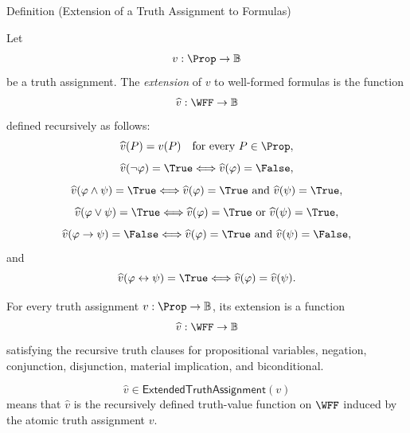 \begin{definitionbox}{Definition (Extension of a Truth Assignment to Formulas)}
\begin{definition}
\label{def:extended-truth-assignment-propositional-logic}
Let
\[
v:\Prop\to\mathbb{B}
\]
be a truth assignment. The \emph{extension} of \(v\) to well-formed formulas is
the function
\[
\widehat v:\WFF\to\mathbb{B}
\]
defined recursively as follows:
\[
\widehat v(P)=v(P)
\quad\text{for every }P\in\Prop,
\]
\[
\widehat v(\neg\varphi)=\True
\Longleftrightarrow
\widehat v(\varphi)=\False,
\]
\[
\widehat v(\varphi\land\psi)=\True
\Longleftrightarrow
\widehat v(\varphi)=\True
\text{ and }
\widehat v(\psi)=\True,
\]
\[
\widehat v(\varphi\lor\psi)=\True
\Longleftrightarrow
\widehat v(\varphi)=\True
\text{ or }
\widehat v(\psi)=\True,
\]
\[
\widehat v(\varphi\to\psi)=\False
\Longleftrightarrow
\widehat v(\varphi)=\True
\text{ and }
\widehat v(\psi)=\False,
\]
and
\[
\widehat v(\varphi\leftrightarrow\psi)=\True
\Longleftrightarrow
\widehat v(\varphi)=\widehat v(\psi).
\]
\end{definition}
\end{definitionbox}

\begin{remark*}
For every truth assignment \(v:\Prop\to\mathbb{B}\), its extension is a function
\[
\widehat v:\WFF\to\mathbb{B}
\]
satisfying the recursive truth clauses for propositional variables, negation,
conjunction, disjunction, material implication, and biconditional.
\end{remark*}

\begin{remark*}
\[
\widehat v\in\mathsf{ExtendedTruthAssignment}(v)
\]
means that \(\widehat v\) is the recursively defined truth-value function on
\(\WFF\) induced by the atomic truth assignment \(v\).
\end{remark*}

